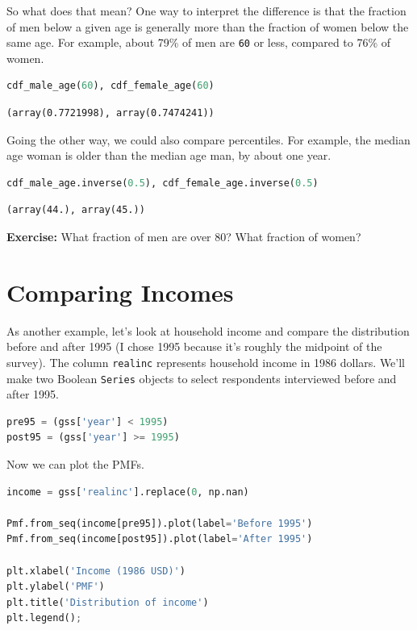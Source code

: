 So what does that mean? One way to interpret the difference is that the
fraction of men below a given age is generally more than the fraction of
women below the same age. For example, about 79\% of men are
\passthrough{\lstinline!60!} or less, compared to 76\% of women.

\begin{lstlisting}[language=Python,style=source]
cdf_male_age(60), cdf_female_age(60)
\end{lstlisting}

\begin{lstlisting}[style=output]
(array(0.7721998), array(0.7474241))
\end{lstlisting}

Going the other way, we could also compare percentiles. For example, the
median age woman is older than the median age man, by about one year.

\begin{lstlisting}[language=Python,style=source]
cdf_male_age.inverse(0.5), cdf_female_age.inverse(0.5)
\end{lstlisting}

\begin{lstlisting}[style=output]
(array(44.), array(45.))
\end{lstlisting}

\textbf{Exercise:} What fraction of men are over 80? What fraction of
women?

\hypertarget{comparing-incomes}{%
\section{Comparing Incomes}\label{comparing-incomes}}

As another example, let's look at household income and compare the
distribution before and after 1995 (I chose 1995 because it's roughly
the midpoint of the survey). The column
\passthrough{\lstinline!realinc!} represents household income in 1986
dollars. We'll make two Boolean \passthrough{\lstinline!Series!} objects
to select respondents interviewed before and after 1995.

\begin{lstlisting}[language=Python,style=source]
pre95 = (gss['year'] < 1995)
post95 = (gss['year'] >= 1995)
\end{lstlisting}

Now we can plot the PMFs.

\begin{lstlisting}[language=Python,style=source]
income = gss['realinc'].replace(0, np.nan)

Pmf.from_seq(income[pre95]).plot(label='Before 1995')
Pmf.from_seq(income[post95]).plot(label='After 1995')

plt.xlabel('Income (1986 USD)')
plt.ylabel('PMF')
plt.title('Distribution of income')
plt.legend();
\end{lstlisting}

